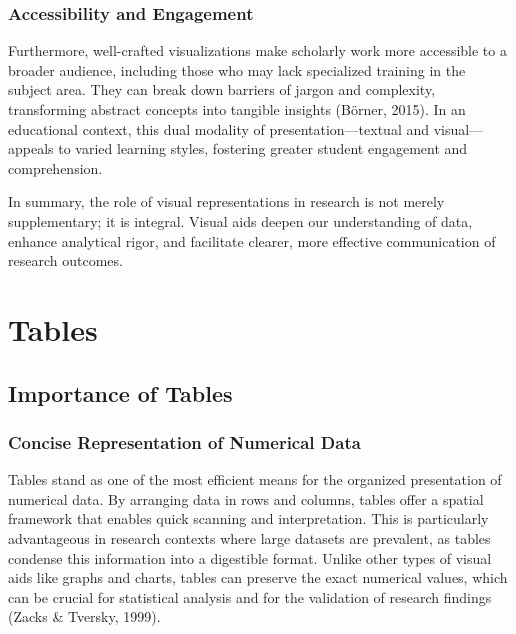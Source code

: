 \documentclass[
  b5paper]{book}
\begin{document}
\hypertarget{accessibility-and-engagement}{%
\subsubsection*{Accessibility and Engagement}\label{accessibility-and-engagement}}

Furthermore, well-crafted visualizations make scholarly work more accessible to a broader audience, including those who may lack specialized training in the subject area. They can break down barriers of jargon and complexity, transforming abstract concepts into tangible insights (Börner, 2015). In an educational context, this dual modality of presentation---textual and visual---appeals to varied learning styles, fostering greater student engagement and comprehension.

In summary, the role of visual representations in research is not merely supplementary; it is integral. Visual aids deepen our understanding of data, enhance analytical rigor, and facilitate clearer, more effective communication of research outcomes.

\hypertarget{tables}{%
\section{Tables}\label{tables}}

\hypertarget{importance-of-tables}{%
\subsection*{Importance of Tables}\label{importance-of-tables}}

\hypertarget{concise-representation-of-numerical-data}{%
\subsubsection*{Concise Representation of Numerical Data}\label{concise-representation-of-numerical-data}}

Tables stand as one of the most efficient means for the organized presentation of numerical data. By arranging data in rows and columns, tables offer a spatial framework that enables quick scanning and interpretation. This is particularly advantageous in research contexts where large datasets are prevalent, as tables condense this information into a digestible format. Unlike other types of visual aids like graphs and charts, tables can preserve the exact numerical values, which can be crucial for statistical analysis and for the validation of research findings (Zacks \& Tversky, 1999).
\end{document}

